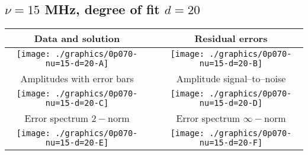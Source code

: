 

% 

\clearpage{}
\break{}

\subsection{$\nu = 15$ MHz, degree of fit $d = 20$}

\begin{table}[h]
    \begin{center}
        \begin{tabular}{ccc}
            Data and solution & \quad & Residual errors \\\hline
            \texttt{[image: ./graphics/0p070-nu=15-d=20-A]} &&
            \texttt{[image: ./graphics/0p070-nu=15-d=20-B]} \\[15pt]
            Amplitudes with error bars && Amplitude signal--to--noise \\\hline
            \texttt{[image: ./graphics/0p070-nu=15-d=20-C]} &&
            \texttt{[image: ./graphics/0p070-nu=15-d=20-D]} \\[15pt]
            Error spectrum $2-$norm && Error spectrum $\infty-$norm \\\hline
            \texttt{[image: ./graphics/0p070-nu=15-d=20-E]} &&
            \texttt{[image: ./graphics/0p070-nu=15-d=20-F]} \\[15pt]
        \end{tabular}
    \end{center}
\label{fig:elev=70, nu=15}
\end{table}



\endinput
